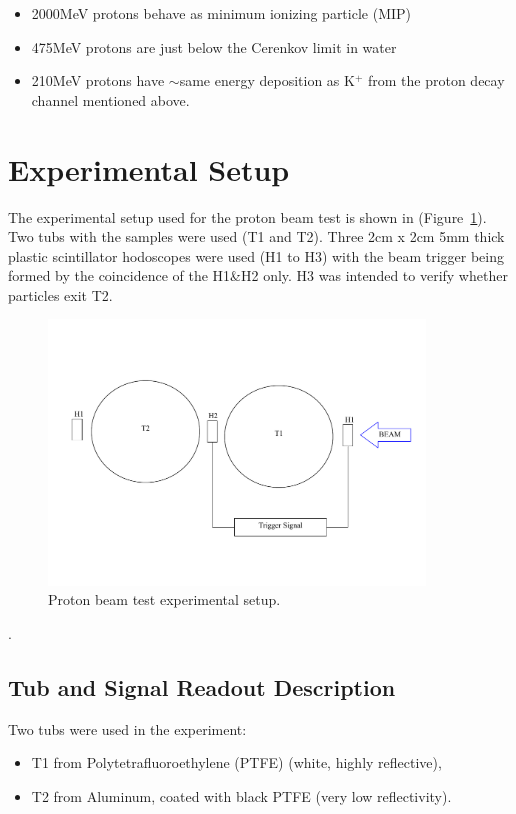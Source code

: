 \documentclass[preprint,12pt]{elsarticle}
\begin{document}
\begin{itemize}
	\item 2000MeV protons behave as minimum ionizing particle (MIP)
	\item 475MeV protons are just below the Cerenkov limit in water
	\item 210MeV protons have $\sim$same energy deposition as K$^{+}$ from the proton decay channel mentioned above.
\end{itemize}
 


 \section{Experimental Setup}
 \label{setup1}

The experimental setup used for the proton beam test is shown in (Figure~\ref{experimentalsetup1}). Two tubs with the samples were used (T1 and T2). Three 2cm x 2cm 5mm thick plastic scintillator hodoscopes were used (H1 to H3) with the beam trigger being formed by the coincidence of the H1\&H2 only. H3 was intended to verify whether particles exit T2.
\begin{figure}[ht]
\centering
\includegraphics[width=100mm]{beamtestschematics1.pdf}
\caption{Proton beam test experimental setup.} \label{experimentalsetup1}
\end{figure}.





\subsection{Tub and Signal Readout Description}
\label{tubs}
Two tubs were used in the experiment:

\begin{itemize}
	\item T1 from Polytetrafluoroethylene (PTFE) (white, highly reflective),
  \item T2 from Aluminum, coated with black PTFE (very low reflectivity).
\end{itemize}
\end{document}
